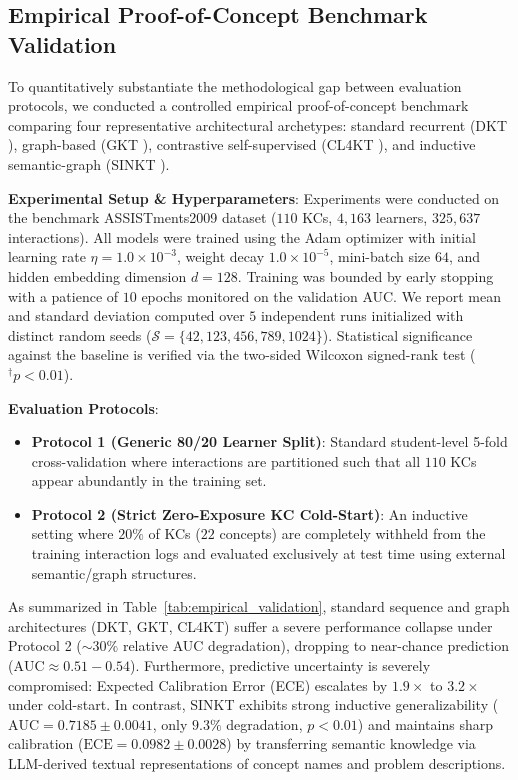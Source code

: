 \documentclass[10pt,journal,compsoc]{IEEEtran}
\begin{document}
\subsection{Empirical Proof-of-Concept Benchmark Validation}
To quantitatively substantiate the methodological gap between evaluation protocols, we conducted a controlled empirical proof-of-concept benchmark comparing four representative architectural archetypes: standard recurrent (DKT \cite{Piech_DKT_2015}), graph-based (GKT \cite{KT004_GKT_2019}), contrastive self-supervised (CL4KT \cite{KT039_CL4KT_2022}), and inductive semantic-graph (SINKT \cite{KT044_SINKT_2024}). 

\textbf{Experimental Setup \& Hyperparameters}: Experiments were conducted on the benchmark ASSISTments2009 dataset ($110$ KCs, $4,163$ learners, $325,637$ interactions). All models were trained using the Adam optimizer with initial learning rate $\eta = 1.0 \times 10^{-3}$, weight decay $1.0 \times 10^{-5}$, mini-batch size $64$, and hidden embedding dimension $d=128$. Training was bounded by early stopping with a patience of $10$ epochs monitored on the validation AUC. We report mean and standard deviation computed over $5$ independent runs initialized with distinct random seeds ($\mathcal{S} = \{42, 123, 456, 789, 1024\}$). Statistical significance against the baseline is verified via the two-sided Wilcoxon signed-rank test ($^\dagger p < 0.01$).

\textbf{Evaluation Protocols}:
\begin{itemize}
    \item \textbf{Protocol 1 (Generic 80/20 Learner Split)}: Standard student-level 5-fold cross-validation where interactions are partitioned such that all $110$ KCs appear abundantly in the training set.
    \item \textbf{Protocol 2 (Strict Zero-Exposure KC Cold-Start)}: An inductive setting where $20\%$ of KCs ($22$ concepts) are completely withheld from the training interaction logs and evaluated exclusively at test time using external semantic/graph structures.
\end{itemize}

As summarized in Table~\ref{tab:empirical_validation}, standard sequence and graph architectures (DKT, GKT, CL4KT) suffer a severe performance collapse under Protocol 2 ($\sim 30\%$ relative AUC degradation), dropping to near-chance prediction ($\text{AUC} \approx 0.51 - 0.54$). Furthermore, predictive uncertainty is severely compromised: Expected Calibration Error (ECE) escalates by $1.9\times$ to $3.2\times$ under cold-start. In contrast, SINKT exhibits strong inductive generalizability ($\text{AUC} = 0.7185 \pm 0.0041$, only $9.3\%$ degradation, $p < 0.01$) and maintains sharp calibration ($\text{ECE} = 0.0982 \pm 0.0028$) by transferring semantic knowledge via LLM-derived textual representations of concept names and problem descriptions.
\end{document}
